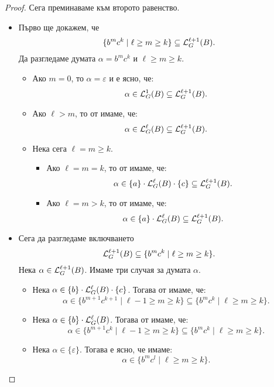 \begin{proof}
  Сега преминаваме към второто равенство.
  \begin{itemize}
  \item
    Първо ще докажем, че
    \[\{b^mc^k \mid \ell \geq m \geq k\} \subseteq \mathcal{L}^{\ell+1}_G(B).\]
    Да разгледаме думата $\alpha = b^mc^k$ и $\ell \geq m \geq k$.
    \begin{itemize}
    \item
      Ако $m = 0$, то $\alpha = \varepsilon$ и е ясно, че:
      \[\alpha \in \mathcal{L}^{1}_G(B) \subseteq \mathcal{L}^{\ell+1}_G(B).\]
    \item
      Ако $\ell > m$, то от \IndHyp имаме, че:
      \[\alpha \in \mathcal{L}^{\ell}_G(B) \subseteq \mathcal{L}^{\ell+1}_G(B).\]
    \item
      Нека сега $\ell = m \geq k$.
      \begin{itemize}
      \item
        Ако $\ell = m = k$, то от \IndHyp имаме, че:
        \[\alpha \in \{a\} \cdot \mathcal{L}^\ell_G(B) \cdot \{c\} \subseteq \mathcal{L}^{\ell+1}_G(B).\]
      \item
        Ако $\ell = m > k$, то от \IndHyp имаме, че:
        \[\alpha \in \{a\} \cdot \mathcal{L}^\ell_G(B) \subseteq \mathcal{L}^{\ell+1}_G(B).\]
      \end{itemize}
    \end{itemize}
  \item
    Сега да разгледаме включването
    \[\mathcal{L}^{\ell+1}_G(B) \subseteq \{b^mc^k \mid \ell \geq m \geq k\}.\]
    Нека $\alpha \in \mathcal{L}^{\ell+1}_G(B)$. Имаме три случая за думата $\alpha$.
    \begin{itemize}
    \item
      Нека $\alpha \in \{b\} \cdot \mathcal{L}^\ell_G(B) \cdot \{c\}$. Тогава от \IndHyp имаме, че:
      \[\alpha \in \{b^{m+1}c^{k+1} \mid \ell-1\geq m \geq k\} \subseteq \{b^mc^k \mid \ell \geq m \geq k\}.\]
    \item
      Нека $\alpha \in \{b\} \cdot \mathcal{L}^\ell_G(B)$. Тогава от \IndHyp имаме, че:
      \[\alpha \in \{b^{m+1}c^{k} \mid \ell-1\geq m \geq k\} \subseteq \{b^mc^k \mid \ell \geq m \geq k\}.\]
    \item
      Нека $\alpha \in \{\varepsilon\}$. Тогава е ясно, че имаме:
      \[\alpha \in \{b^mc^l \mid \ell \geq m \geq k\}.\]
    \end{itemize}
  \end{itemize}
\end{proof}

